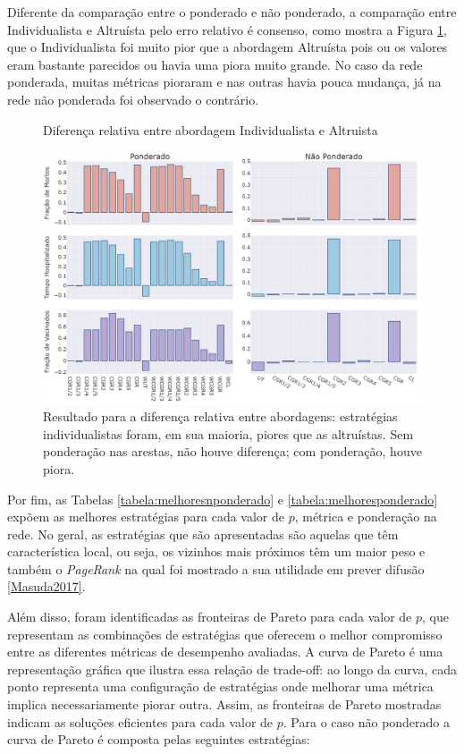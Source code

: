 Diferente da comparação entre o ponderado e não ponderado, a comparação entre Individualista e Altruísta pelo erro relativo é consenso, como mostra a Figura \ref{fig:compara_altruismo}, que o Individualista foi muito pior que a abordagem Altruísta pois ou os valores eram bastante parecidos ou havia uma piora muito grande. 
No caso da rede ponderada, muitas métricas pioraram e nas outras havia pouca mudança, já na rede não ponderada 
foi observado 
o contrário.
\begin{figure}[H]
    \centering
    \captionsetup{font=normalsize,skip=0.8pt,singlelinecheck=on,labelsep=endash}
    \caption{Diferença relativa entre abordagem Individualista e Altruista}
    
    \includegraphics[scale= 0.3]{figuras/compara_altruismo_0.0.png}
    \captionsetup{font=small,justification=justified}
    \caption*{Resultado para a diferença relativa entre abordagens: estratégias individualistas foram, em sua maioria, piores que as altruístas. Sem ponderação nas arestas, não houve diferença; com ponderação, houve piora.}
    \label{fig:compara_altruismo}
\end{figure}

Por fim, as Tabelas \ref{tabela:melhoresnponderado} e \ref{tabela:melhoresponderado} 
expõem as melhores estratégias para cada valor de $p$, métrica e ponderação na rede. 
 No geral, as estratégias que são apresentadas são aquelas que têm característica local, ou seja, os vizinhos mais próximos têm um maior peso e também o \textit{PageRank} na qual foi mostrado a sua utilidade em prever difusão \ref{Masuda2017}.

Além disso, foram identificadas as fronteiras de Pareto para cada valor de \( p \), que representam as combinações de estratégias que oferecem o melhor compromisso entre as diferentes métricas de desempenho avaliadas. A curva de Pareto é uma representação gráfica que ilustra essa relação de trade-off: ao longo da curva, cada ponto representa uma configuração de estratégias onde melhorar uma métrica implica necessariamente piorar outra. Assim, as fronteiras de Pareto mostradas indicam as soluções eficientes para cada valor de \( p \). Para o caso não ponderado a curva de Pareto é composta pelas seguintes estratégias:

